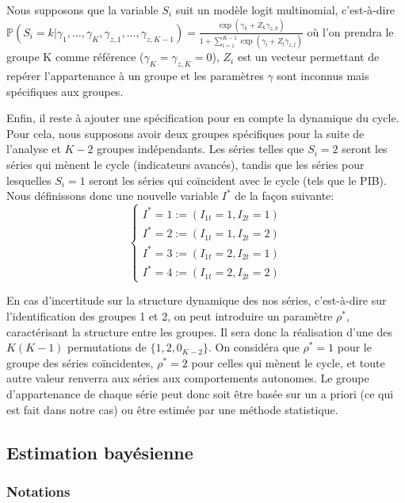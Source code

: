 \documentclass[10pt,french,french]{article}
\begin{document}
Nous supposons que la variable \(S_i\) suit un modèle logit multinomial, c'est-à-dire \(\mathbb{P}(S_i = k |\gamma_1, \dots, \gamma_K, \gamma_{z,1}, \dots, \gamma_{z,K-1}) = \displaystyle\frac{\exp(\gamma_k + Z_k\gamma_{z,k})}{1 + \sum\limits_{l=1}^{K-1} \exp(\gamma_l + Z_l\gamma_{z,l})}\) où l'on prendra le groupe K comme référence (\(\gamma_K = \gamma_{z,K}=0\)), \(Z_i\) est un vecteur permettant de repérer l'appartenance à un groupe et les paramètres \(\gamma\) sont inconnus mais spécifiques aux groupes.

Enfin, il reste à ajouter une spécification pour en compte la dynamique du cycle.
Pour cela, nous supposons avoir deux groupes spécifiques pour la suite de l'analyse et \(K-2\) groupes indépendants.
Les séries telles que \(S_i = 2\) seront les séries qui mènent le cycle (indicateurs avancés), tandis que les séries pour lesquelles \(S_i = 1\) seront les séries qui coïncident avec le cycle (tels que le PIB).
Nous définissons donc une nouvelle variable \(I^*\) de la façon suivante: \[\begin{cases}
I^* = 1 := (I_{1t}=1,I_{2t}=1) \\
I^* = 2 := (I_{1t}=1,I_{2t}=2) \\
I^* = 3 := (I_{1t}=2,I_{2t}=1) \\
I^* = 4 := (I_{1t}=2,I_{2t}=2) 
\end{cases}\]

En cas d'incertitude sur la structure dynamique des nos séries, c'est-à-dire sur l'identification des groupes 1 et 2, on peut introduire un paramètre \(\rho^*\), caractérisant la structure entre les groupes.
Il sera donc la réalisation d'une des \(K(K-1)\) permutations de \(\{1,2,0_{K-2}\}\).
On considéra que \(\rho^*=1\) pour le groupe des séries coïncidentes, \(\rho^*=2\) pour celles qui mènent le cycle, et toute autre valeur renverra aux séries aux comportements autonomes.
Le groupe d'appartenance de chaque série peut donc soit être basée sur un a priori (ce qui est fait dans notre cas) ou être estimée par une méthode statistique.

\hypertarget{estimation-bayuxe9sienne}{%
\subsection{Estimation bayésienne}\label{estimation-bayuxe9sienne}}

\hypertarget{notations}{%
\subsubsection{Notations}\label{notations}}
\end{document}
